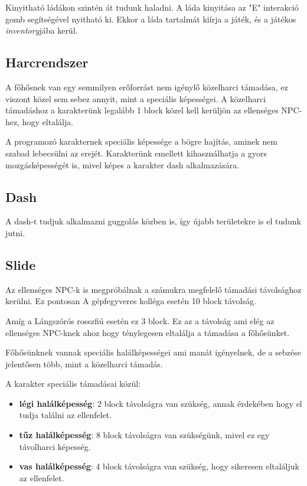 \documentclass[a4paper]{article}
\begin{document}
Kinyitható ládákon szintén át tudunk haladni. A láda kinyitása az "E" interakció gomb segítségével nyitható ki.
Ekkor a láda tartalmát kiírja a játék, és a játékos \textit{inventory}jába kerül.

\subsection{Harcrendszer}

A főhősnek van egy semmilyen erőforrást nem igénylő közelharci támadása, ez viszont közel sem sebez annyit, mint a speciális képességei.
A közelharci támadáshoz a karakterünk legalább 1 block közel kell kerüljön az ellenséges NPC-hez, hogy eltalálja.

A programozó karakternek speciális képessége a bögre hajítás, aminek nem szabad lebecsülni az erejét.
Karakterünk emellett kihasználhatja a gyors mozgásképességét is, mivel képes a karakter dash alkalmazására.

\subsection{Dash}

A dash-t tudjuk alkalmazni guggolás közben is, így újabb területekre is el tudunk jutni.

\subsection{Slide}

Az ellenséges NPC-k is megpróbálnak a számukra megfelelő támadási távolsághoz kerülni.
Ez pontosan A gépfegyveres kolléga esetén 10 block távolság.

Amíg a Lángszórós rosszfiú esetén ez 3 block. Ez az a távolság ami elég az ellenséges NPC-knek ahoz hogy ténylegesen eltalálja a támadása a főhősünket.

Főhősünknek vannak speciális halálképességei ami manát igényelnek, de a sebzése jelentősen több, mint a közelharci támadás.

A karakter speciális támadásai közül:
\begin{itemize}
\item \textbf{légi halálképesség}: 2 block távolságra van szükség, annak érdekében hogy el tudja találni az ellenfelet.
\item \textbf{tűz halálképesség}: 8 block távolságra van szükségünk, mivel ez egy távolharci képesség.
\item \textbf{vas halálképesség}: 4 block távolságra van szükség, hogy sikeresen eltaláljuk az ellenfelet.
\end{itemize}
\end{document}
